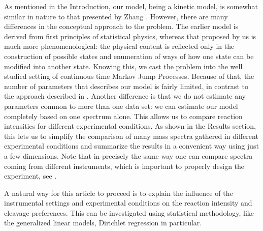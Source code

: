 \documentclass{llncs}
\begin{document}

        As mentioned in the Introduction, our model, being a kinetic model, is somewhat similar in nature to that presented by Zhang \cite{Zhang2010-fp}. However, there are many differences in the conceptual approach to the problem. The earlier model is derived from first principles of statistical physics, whereas that proposed by us is much more phenomenological: the physical content is reflected only in the construction of possible states and enumeration of ways of how one state can be modified into another state. Knowing this, we cast the problem into the well studied setting of continuous time Markov Jump Processes. Because of that, the number of parameters that describes our model is fairly limited, in contrast to the approach described in  \cite{Zhang2010-fp}. Another difference is that we do not estimate any parameters common to more than one data set: we can estimate our model completely based on one spectrum alone. This allows us to compare reaction intensities for different experimental conditions. As shown in the Results section, this lets us to simplify the comparison of many mass spectra gathered in different experimental conditions and summarize the results in a convenient way using just a few dimensions. Note that in precisely the same way one can compare spectra coming from different instruments, which is important to properly design the experiment, see \cite{Lermyte2015-lm}.

        A natural way for this article to proceed is to explain the influence of the instrumental settings and experimental conditions on the reaction intensity and cleavage preferences. This can be investigated using statistical methodology, like the generalized linear models, Dirichlet regression in particular.
\end{document}
